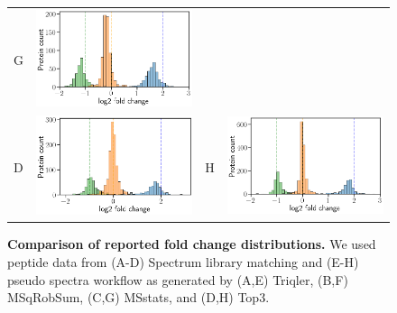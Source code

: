 \documentclass[11pt]{article}
\begin{document}
\begin{figure}[hbt]
\begin{tabular}{lclc}
        G & \includegraphics[width=0.4\linewidth]{../../result/report_plots_filtered/diann_msstats_intensity.png} \\ 
        D & \includegraphics[width=0.4\linewidth]{../../result/report_plots_filtered/osw_top3_intensity.png} &
        H & \includegraphics[width=0.4\linewidth]{../../result/report_plots_filtered/diann_top3_intensity.png} 
    \end{tabular}
    \caption{{\bf Comparison of reported fold change distributions.} We used peptide data from (A-D) Spectrum library matching and (E-H) pseudo spectra workflow as generated by 
    (A,E) Triqler, (B,F) MSqRobSum, (C,G) MSstats, and (D,H) Top3. \label{fig:fc_histogram_supplement}}
\end{figure}
\end{document}
